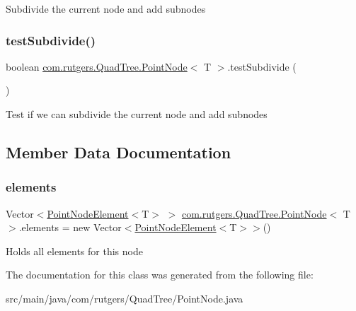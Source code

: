 Subdivide the current node and add subnodes \mbox{\label{classcom_1_1rutgers_1_1QuadTree_1_1PointNode_ad9eb9b306f9604a2c688a6c906cb6e83}} 
\subsubsection{\texorpdfstring{test\+Subdivide()}{testSubdivide()}}
{\footnotesize\ttfamily boolean \hyperlink{classcom_1_1rutgers_1_1QuadTree_1_1PointNode}{com.\+rutgers.\+Quad\+Tree.\+Point\+Node}$<$ T $>$.test\+Subdivide (\begin{DoxyParamCaption}{ }\end{DoxyParamCaption})}

Test if we can subdivide the current node and add subnodes 

\subsection{Member Data Documentation}
\mbox{\label{classcom_1_1rutgers_1_1QuadTree_1_1PointNode_a0e05238a78062b65ab3953980cb8889c}} 
\subsubsection{\texorpdfstring{elements}{elements}}
{\footnotesize\ttfamily Vector$<$\hyperlink{classcom_1_1rutgers_1_1QuadTree_1_1PointNodeElement}{Point\+Node\+Element}$<$T$>$ $>$ \hyperlink{classcom_1_1rutgers_1_1QuadTree_1_1PointNode}{com.\+rutgers.\+Quad\+Tree.\+Point\+Node}$<$ T $>$.elements = new Vector$<$\hyperlink{classcom_1_1rutgers_1_1QuadTree_1_1PointNodeElement}{Point\+Node\+Element}$<$T$>$$>$()\hspace{0.3cm}{\ttfamily [protected]}}

Holds all elements for this node 

The documentation for this class was generated from the following file\+:\begin{DoxyCompactItemize}
\item 
src/main/java/com/rutgers/\+Quad\+Tree/Point\+Node.\+java\end{DoxyCompactItemize}
